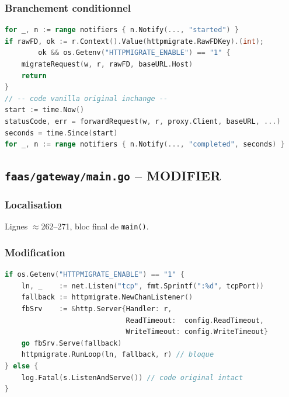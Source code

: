 \documentclass[11pt,a4paper]{article}
\begin{document}
\subsubsection{Branchement conditionnel}

\begin{lstlisting}[language=Go]
for _, n := range notifiers { n.Notify(..., "started") }
if rawFD, ok := r.Context().Value(httpmigrate.RawFDKey).(int);
        ok && os.Getenv("HTTPMIGRATE_ENABLE") == "1" {
    migrateRequest(w, r, rawFD, baseURL.Host)
    return
}
// -- code vanilla original inchange --
start := time.Now()
statusCode, err = forwardRequest(w, r, proxy.Client, baseURL, ...)
seconds = time.Since(start)
for _, n := range notifiers { n.Notify(..., "completed", seconds) }
\end{lstlisting}


\subsection{\texttt{faas/gateway/main.go} -- MODIFIER}

\subsubsection{Localisation}
Lignes $\approx$262--271, bloc final de \texttt{main()}.

\subsubsection{Modification}
\begin{lstlisting}[language=Go]
if os.Getenv("HTTPMIGRATE_ENABLE") == "1" {
    ln, _    := net.Listen("tcp", fmt.Sprintf(":%d", tcpPort))
    fallback := httpmigrate.NewChanListener()
    fbSrv    := &http.Server{Handler: r,
                             ReadTimeout:  config.ReadTimeout,
                             WriteTimeout: config.WriteTimeout}
    go fbSrv.Serve(fallback)
    httpmigrate.RunLoop(ln, fallback, r) // bloque
} else {
    log.Fatal(s.ListenAndServe()) // code original intact
}
\end{lstlisting}
\end{document}
